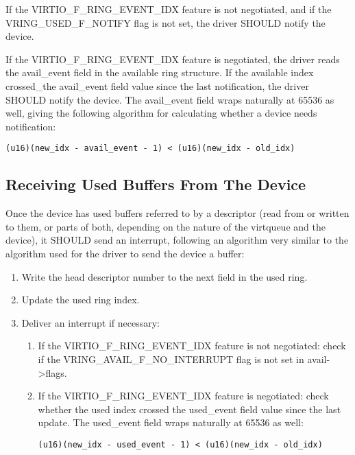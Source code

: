If the VIRTIO_F_RING_EVENT_IDX feature is not negotiated, and if the
VRING_USED_F_NOTIFY flag is not set, the driver SHOULD notify the
device.

If the VIRTIO_F_RING_EVENT_IDX feature is negotiated, the driver reads the
avail_event field in the available ring structure. If the
available index crossed_the avail_event field value since the
last notification, the driver SHOULD notify the device.  The avail_event field wraps naturally at 65536 as well,
giving the following algorithm for calculating whether a device needs
notification:

\begin{lstlisting}
(u16)(new_idx - avail_event - 1) < (u16)(new_idx - old_idx)
\end{lstlisting}

\subsection{Receiving Used Buffers From The Device}\label{sec:General Initialization And Device Operation / Device Operation / Receiving Used Buffers From The Device}

Once the device has used buffers referred to by a descriptor (read from or written to them, or
parts of both, depending on the nature of the virtqueue and the
device), it SHOULD send an interrupt, following an algorithm very
similar to the algorithm used for the driver to send the device a
buffer:

\begin{enumerate}
\item Write the head descriptor number to the next field in the used
  ring.

\item Update the used ring index.

\item Deliver an interrupt if necessary:

  \begin{enumerate}
  \item If the VIRTIO_F_RING_EVENT_IDX feature is not negotiated:
    check if the VRING_AVAIL_F_NO_INTERRUPT flag is not set in
    avail->flags.

  \item If the VIRTIO_F_RING_EVENT_IDX feature is negotiated: check
    whether the used index crossed the used_event field value
    since the last update. The used_event field wraps naturally
    at 65536 as well:
\begin{lstlisting}
(u16)(new_idx - used_event - 1) < (u16)(new_idx - old_idx)
\end{lstlisting}
  \end{enumerate}
\end{enumerate}

